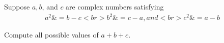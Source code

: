 Suppose $a, b$, and $c$ are complex numbers satisfying
$$\begin{aligned}

a^{2} \& =b-c <br>
b^{2} \& =c-a, and <br>
c^{2} \& =a-b

\end{aligned}$$

Compute all possible values of $a+b+c$.
